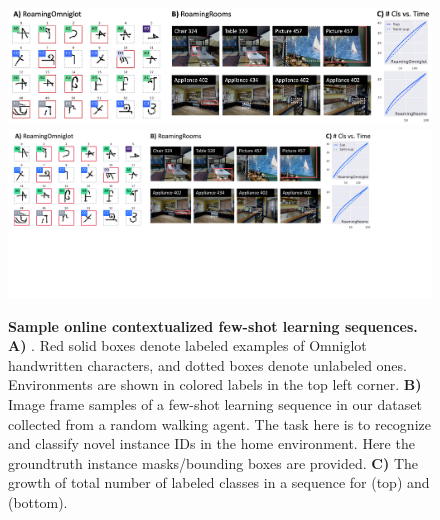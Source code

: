 \begin{figure}[t]
\vspace{-0.5in}
\centering
\iflatexml
\includegraphics[width=6\textwidth]{figures/datasets-copy-samll-compressed-2.png}
\else
\includegraphics[width=\textwidth, trim={0cm 7cm 6.5cm 0}, clip]{figures/datasets-copy-small-compressed-2.pdf}
\fi
\vspace{-0.32in}
\caption{ \textbf{Sample online contextualized few-shot learning sequences.} \textbf{A)}
\ourchar{}. Red solid boxes denote labeled examples of Omniglot handwritten characters, and
dotted boxes denote unlabeled ones. Environments are shown in colored labels in the top left corner.
\textbf{B)} Image frame samples of a few-shot learning sequence in our \ourroom{} dataset collected
from a random walking agent. The task here is to recognize and classify novel instance IDs in the home environment. Here the groundtruth instance masks/bounding boxes are provided.
\textbf{C)} The growth of total number of labeled classes in a sequence for \ourchar{} (top) and
\ourroom{} (bottom).}
\label{fig:dataset}
\vspace{-0.15in}
\end{figure}
